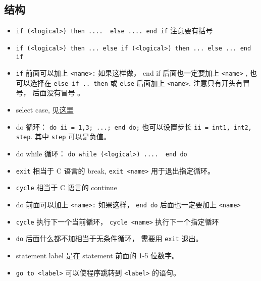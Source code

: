 \subsection{结构}
\begin{itemize}
\item \verb`if (<logical>) then ....  else .... end if` 注意要有括号
\item \verb`if (<logical>) then ... else if (<logical>) then ... else ... end if`
\item \verb`if` 前面可以加上 \verb`<name>:` 如果这样做，  end if 后面也一定要加上 \verb`<name>`  , 也可以选择在 \verb`else if .. then` 或 \verb`else` 后面加上 \verb`<name>`. 注意只有开头有冒号， 后面没有冒号 。
\item select case, 见\href{http://www.tutorialspoint.com/fortran/select_case_construct.htm}{这里}
\item do 循环：   \verb`do ii = 1,3; ...; end do;` 也可以设置步长 \verb`ii = int1, int2, step`. 其中 \verb`step` 可以是负值。
\item do while 循环： \verb`do while (<logical>) ....  end do`
\item \verb`exit` 相当于 C 语言的 break, \verb`exit <name>` 用于退出指定循环。
\item \verb`cycle` 相当于 C 语言的 continue
\item do 前面可以加上 \verb`<name>:` 如果这样， \verb`end do` 后面也一定要加上 \verb`<name>`
\item \verb`cycle` 执行下一个当前循环， \verb`cycle <name>` 执行下一个指定循环
\item \verb`do` 后面什么都不加相当于无条件循环， 需要用 \verb`exit` 退出。
\item statement label 是在 statement 前面的 1-5 位数字。
\item \verb`go to <label>` 可以使程序跳转到 \verb`<label>` 的语句。
\end{itemize}

